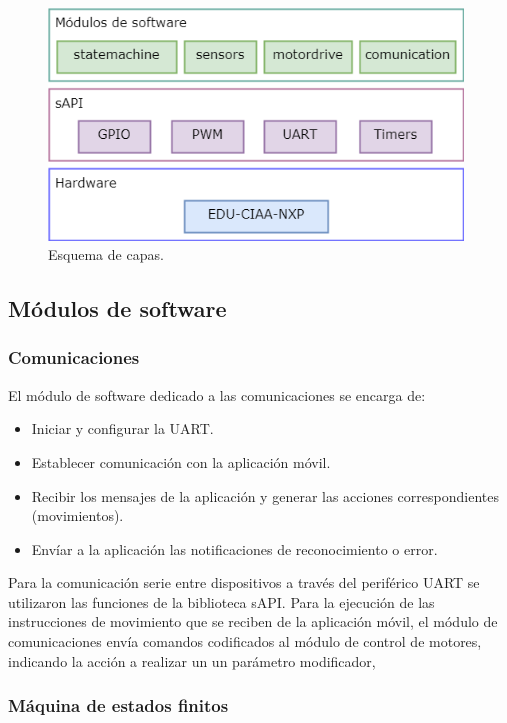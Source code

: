 \begin{figure}[h]
	\centering
	\includegraphics[width=11cm]{./Figures/capas.png}
	\caption{Esquema de capas.}
	\label{fig:capas}
\end{figure}

\subsection{Módulos de software}


\subsubsection{Comunicaciones}

El módulo de software dedicado a las comunicaciones se encarga de:

\begin{itemize}
	\item Iniciar y configurar la UART.
	\item Establecer comunicación con la aplicación móvil.
	\item Recibir los mensajes de la aplicación y generar las acciones correspondientes (movimientos).
	\item Envíar a la aplicación las notificaciones de reconocimiento o error.
\end{itemize}

Para la comunicación serie entre dispositivos a través del periférico UART se utilizaron las funciones de la biblioteca sAPI.
Para la ejecución de las instrucciones de movimiento que se reciben de la aplicación móvil, el módulo de comunicaciones envía comandos codificados al módulo de control de motores, indicando la acción a realizar un un parámetro modificador,



\subsubsection{Máquina de estados finitos}

